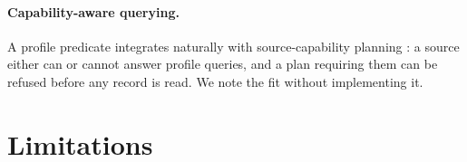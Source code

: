 \documentclass[11pt,twocolumn,a4paper]{article}
\theoremstyle{upthm}
\theoremstyle{definition}
\theoremstyle{remark}
\begin{document}
\paragraph{Capability-aware querying.} A profile predicate integrates
naturally with source-capability planning \citep{levy1996,perez2009,%
angles2017}: a source either can or cannot answer profile queries, and a
plan requiring them can be refused before any record is read. We note the
fit without implementing it.

\section{Limitations}
\label{sec:limits}
\end{document}
